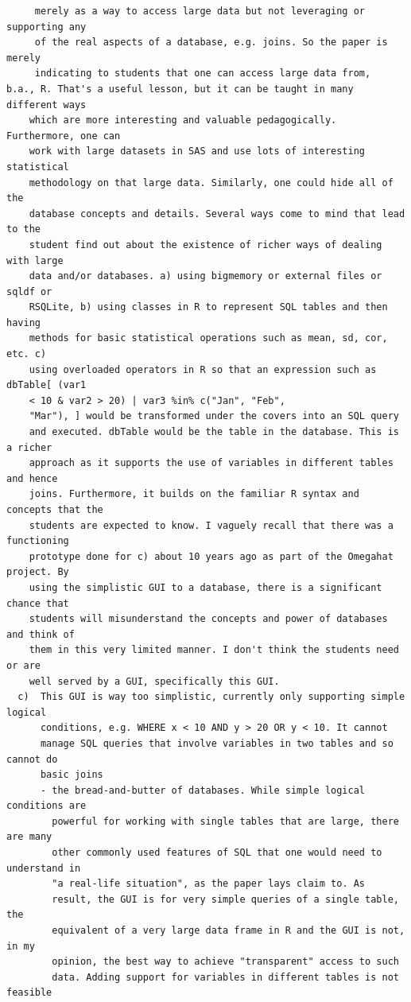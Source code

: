 \documentclass[11pt]{tise_style}
\begin{document}
\begin{verbatim}
     merely as a way to access large data but not leveraging or supporting any
     of the real aspects of a database, e.g. joins. So the paper is merely
     indicating to students that one can access large data from,
b.a., R. That's a useful lesson, but it can be taught in many different ways
    which are more interesting and valuable pedagogically. Furthermore, one can
    work with large datasets in SAS and use lots of interesting statistical
    methodology on that large data. Similarly, one could hide all of the
    database concepts and details. Several ways come to mind that lead to the
    student find out about the existence of richer ways of dealing with large
    data and/or databases. a) using bigmemory or external files or sqldf or
    RSQLite, b) using classes in R to represent SQL tables and then having
    methods for basic statistical operations such as mean, sd, cor, etc. c)
    using overloaded operators in R so that an expression such as dbTable[ (var1
    < 10 & var2 > 20) | var3 %in% c("Jan", "Feb",
    "Mar"), ] would be transformed under the covers into an SQL query
    and executed. dbTable would be the table in the database. This is a richer
    approach as it supports the use of variables in different tables and hence
    joins. Furthermore, it builds on the familiar R syntax and concepts that the
    students are expected to know. I vaguely recall that there was a functioning
    prototype done for c) about 10 years ago as part of the Omegahat project. By
    using the simplistic GUI to a database, there is a significant chance that
    students will misunderstand the concepts and power of databases and think of
    them in this very limited manner. I don't think the students need or are
    well served by a GUI, specifically this GUI.
  c)  This GUI is way too simplistic, currently only supporting simple logical
      conditions, e.g. WHERE x < 10 AND y > 20 OR y < 10. It cannot
      manage SQL queries that involve variables in two tables and so cannot do
      basic joins
      - the bread-and-butter of databases. While simple logical conditions are
        powerful for working with single tables that are large, there are many
        other commonly used features of SQL that one would need to understand in
        "a real-life situation", as the paper lays claim to. As
        result, the GUI is for very simple queries of a single table, the
        equivalent of a very large data frame in R and the GUI is not, in my
        opinion, the best way to achieve "transparent" access to such
        data. Adding support for variables in different tables is not feasible

\end{verbatim}
\end{document}
